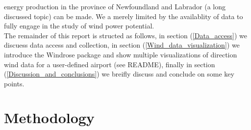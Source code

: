 \documentclass{article}
\begin{document}
energy production in the province of Newfoundland and Labrador (a long discussed topic) can be made. We a merely limited by the availablity of data to fully engage in the study of wind power potential. 
\\
\indent The remainder of this report is structed as follows, in section (\ref{Data_access}) we discuess data access and collection, in section (\ref{Wind_data_visualization}) we introduce the Windrose  
package and show multiple visualizations of direction wind data for a user-defined airport (see README), finally in section (\ref{Discussion_and_conclusions}) we breifly discuss and conclude on some key 
points.      

\section{Methodology}\label{Methodology}
\end{document}
